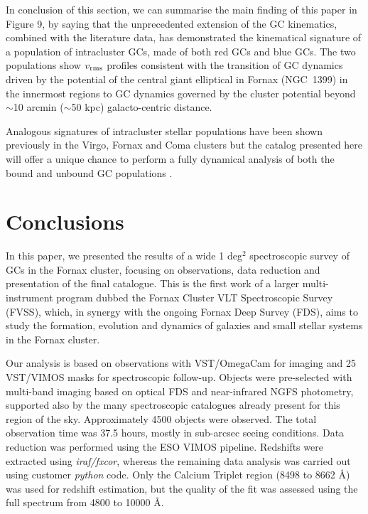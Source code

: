 \documentclass[usenatbib]{mnras}
\begin{document}
In conclusion of this section, we can summarise the main finding of this paper
in Figure 9, by saying that the unprecedented extension of the GC kinematics,
combined with the literature data, has demonstrated the kinematical signature
of a population of intracluster GCs, made of both red GCs and blue GCs.
The two populations show $v_{\rm rms}$ profiles consistent with the transition of GC
dynamics driven by the potential of the central giant elliptical in Fornax (NGC~1399)
in the innermost regions to GC dynamics governed by the cluster potential
beyond $\sim$10 arcmin ($\sim$50 kpc) galacto-centric distance.

Analogous signatures of intracluster stellar populations have been shown
previously in the Virgo, Fornax and Coma clusters \citep[see e.g., ][]{Paolillo02, Arnaboldi04, Peng11,
Longobardi15} but the catalog presented here will offer a unique
chance to perform a fully dynamical analysis of both the bound and unbound GC
populations \citep{DAbrusco16}.

\section{Conclusions}
\label{sec:conclusions}
In this paper, we presented the results of a wide 1 deg$^2$ spectroscopic survey of
GCs in the Fornax cluster, focusing on observations, data
reduction and presentation of the final catalogue. This is the first work of a
larger multi-instrument program dubbed the Fornax Cluster VLT Spectroscopic
Survey (FVSS), which, in synergy with the ongoing Fornax Deep Survey (FDS),
aims to study the formation, evolution and dynamics of galaxies and small
stellar systems in the Fornax cluster.

Our analysis is based on observations with VST/OmegaCam for imaging and 25
VST/VIMOS masks for spectroscopic follow-up. Objects were pre-selected
with multi-band imaging based on optical FDS and near-infrared NGFS photometry,
supported also by the many spectroscopic catalogues already
present for this region of the sky.  Approximately 4500 objects were observed.
The total observation time was 37.5 hours, mostly in sub-arcsec seeing
conditions. Data reduction was performed using the ESO VIMOS pipeline.
Redshifts were extracted using {\it iraf/fxcor}, whereas the remaining data analysis
was carried out using customer {\it python} code. Only the Calcium Triplet region
(8498 to 8662 \AA) was used for redshift estimation, but the quality of the fit
was assessed using the full spectrum from 4800 to 10000 \AA.
\end{document}
